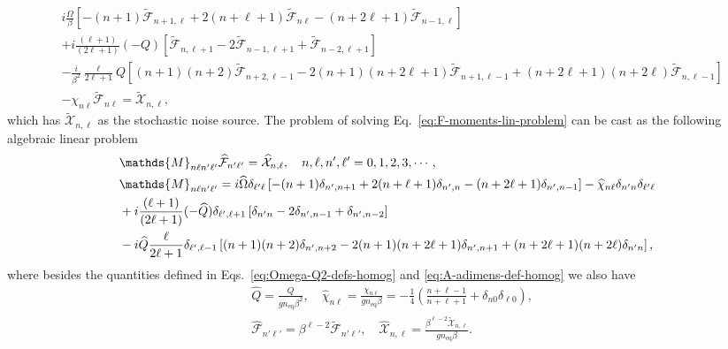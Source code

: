 \documentclass[aps,prd,preprint,nofootinbib,amsmath,amssymb,showpacs,longbibliography,singlecolumn,superscriptaddress,10pt]{revtex4-1}
\theoremstyle{plain}
\theoremstyle{definition}
\begin{document}
\begin{equation}
\label{eq:F-moments-lin-problem}
\begin{aligned}
&
i \frac{\Omega}{\beta} \left[
-(n+1) 
\widetilde{\mathcal{F}}_{n+1,\ell}+
2(n+\ell+1)
\widetilde{\mathcal{F}}_{n\ell}
-
(n+2\ell+1)
\widetilde{\mathcal{F}}_{n-1,\ell}
\right]
\\
&
+ 
i \frac{(\ell + 1)}{(2 \ell + 1)} (-Q) \left[ \widetilde{\mathcal{F}}_{n,\ell+1}
-
2 \widetilde{\mathcal{F}}_{n-1,\ell+1}
+
\widetilde{\mathcal{F}}_{n-2,\ell+1}
\right]
\\
&
-
\frac{i}{\beta^{2}}
 \frac{\ell}{2 \ell + 1}
Q
\left[
(n+1)(n+2)
\widetilde{\mathcal{F}}_{n+2,\ell-1}
-
2(n+1)(n+2\ell+1)
\widetilde{\mathcal{F}}_{n+1,\ell-1}
+
(n+2\ell+1)(n+2\ell)
\widetilde{\mathcal{F}}_{n,\ell-1}
\right]
\\
&
-
\chi_{n\ell}
\widetilde{\mathcal{F}}_{n\ell} 
   = 
\widetilde{\mathcal{X}}_{n,\ell} 
,
\end{aligned}
\end{equation}
%
which has $\widetilde{\mathcal{X}}_{n,\ell}$ as the stochastic noise source. The problem of solving Eq.~\eqref{eq:F-moments-lin-problem} can be cast as the following algebraic linear problem
%
\begin{subequations}
\label{eq:inhomog-case-lin-prob}
\begin{align}
&
\label{eq:inhomog-case-lin-prob-a}
\mathds{M}_{n \ell n' \ell'} \widehat{\mathcal{F}}_{n'\ell'}
=
\widehat{\mathcal{X}}_{n, \ell},
\quad
n, \ell, n', \ell' = 0,1,2,3, \cdots,
\\
&
\mathds{M}_{n \ell n' \ell'} = i \widehat{\Omega} \delta_{\ell'\ell} \left[
-(n+1) 
\delta_{n',n+1}
+
2(n+\ell+1)
\delta_{n',n}
-
(n+2\ell+1)
\delta_{n',n-1}
\right]
-
\widehat{\chi}_{n\ell}
\delta_{n' n} \delta_{\ell' \ell}
\notag
\\
&
+ 
i \frac{(\ell + 1)}{(2 \ell + 1)} (-\widehat{Q}) \delta_{\ell',\ell+1} \left[ \delta_{n'n}
-
2 \delta_{n',n-1}
+
\delta_{n',n-2}
\right]
\notag
\\
&
\label{eq:inhomog-case-lin-prob-b}
-
i \widehat{Q}
 \frac{\ell}{2 \ell + 1}
 \delta_{\ell',\ell-1}
\left[
(n+1)(n+2)
\delta_{n',n+2} 
-
2(n+1)(n+2\ell+1)
\delta_{n', n+1}
+
(n+2\ell+1)(n+2\ell)
\delta_{n' n} 
\right],
\end{align}    
\end{subequations}
%
where besides the quantities defined in Eqs.~\eqref{eq:Omega-Q2-defs-homog} and \eqref{eq:A-adimens-def-homog} we also have
%
\begin{equation}
\label{eq:Omega-Q2-defs-inhomog}
\begin{aligned}
&
\widehat{Q} = \frac{Q}{g n_{\mathrm{eq}} \beta^{2}},
\quad
\widehat{\chi}_{n \ell} =  \frac{\chi_{n\ell}}{g n_{\mathrm{eq}} \beta} = - \frac{1}{4}  \left(\frac{n+\ell-1}{n+\ell+1} + \delta_{n0}\delta_{\ell 0}\right), 
\\
&
\widehat{\mathcal{F}}_{n'\ell'}
=
\beta^{\ell-2} \widetilde{\mathcal{F}}_{n'\ell'},
\quad
\widehat{\mathcal{X}}_{n, \ell} = \frac{\beta^{\ell - 2}\widetilde{\mathcal{X}}_{n, \ell}}{g n_{\mathrm{eq}} \beta}.
\end{aligned}    
\end{equation}
\end{document}
